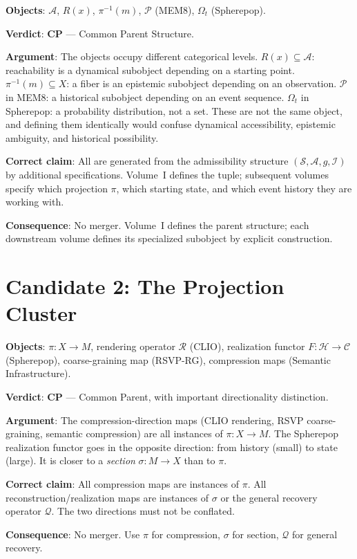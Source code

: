 \documentclass[11pt, a4paper]{book}
\theoremstyle{flyxion}
\theoremstyle{remark}
\begin{document}
\begin{flybox}
\textbf{Objects}: $\mathcal{A}$, $R(x)$, $\pi^{-1}(m)$,
$\mathcal{P}$ (MEM\textbar{}8), $\Omega_t$ (Spherepop).

\textbf{Verdict}: \textbf{CP} --- Common Parent Structure.

\textbf{Argument}: The objects occupy different categorical levels.
$R(x) \subseteq \mathcal{A}$: reachability is a dynamical subobject
depending on a starting point. $\pi^{-1}(m) \subseteq X$: a fiber
is an epistemic subobject depending on an observation. $\mathcal{P}$
in MEM\textbar{}8: a historical subobject depending on an event
sequence. $\Omega_t$ in Spherepop: a probability distribution, not
a set. These are not the same object, and defining them identically
would confuse dynamical accessibility, epistemic ambiguity, and
historical possibility.

\textbf{Correct claim}: All are generated from the admissibility
structure $(\mathcal{S}, \mathcal{A}, g, \mathcal{I})$ by additional
specifications. Volume~I defines the tuple; subsequent volumes specify
which projection $\pi$, which starting state, and which event history
they are working with.

\textbf{Consequence}: No merger. Volume~I defines the parent structure;
each downstream volume defines its specialized subobject by
explicit construction.
\end{flybox}

\section{Candidate 2: The Projection Cluster}

\begin{flybox}
\textbf{Objects}: $\pi: X \to M$, rendering operator $\mathcal{R}$
(CLIO), realization functor $F: \mathcal{H} \to \mathcal{C}$
(Spherepop), coarse-graining map (RSVP-RG), compression maps
(Semantic Infrastructure).

\textbf{Verdict}: \textbf{CP} --- Common Parent, with important
directionality distinction.

\textbf{Argument}: The compression-direction maps (CLIO rendering,
RSVP coarse-graining, semantic compression) are all instances of
$\pi: X \to M$. The Spherepop realization functor goes in the
opposite direction: from history (small) to state (large). It is
closer to a \emph{section} $\sigma: M \to X$ than to $\pi$.

\textbf{Correct claim}: All compression maps are instances of $\pi$.
All reconstruction/realization maps are instances of $\sigma$ or the
general recovery operator $\mathcal{Q}$. The two directions must
not be conflated.

\textbf{Consequence}: No merger. Use $\pi$ for compression, $\sigma$
for section, $\mathcal{Q}$ for general recovery.
\end{flybox}
\end{document}
